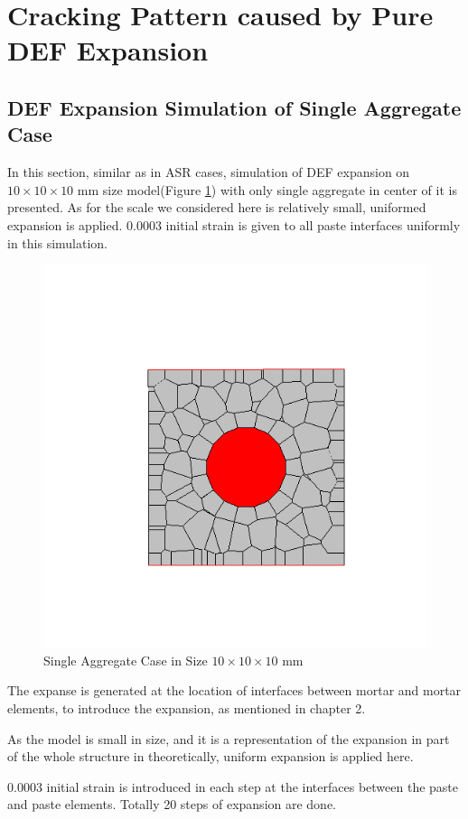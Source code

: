 \clearpage
\section{Cracking Pattern caused by Pure DEF Expansion}

\subsection{DEF Expansion Simulation of Single Aggregate Case}

In this section, similar as in ASR cases, simulation of DEF expansion on $10 \times 10 \times 10$ mm size model(Figure \ref{mmmm}) with only single aggregate in center of it is presented. As for the scale we considered here is relatively small, uniformed expansion is applied. 0.0003 initial strain is given to all paste interfaces uniformly in this simulation.

\begin{figure}[h!]
\centering

\includegraphics[width=0.4\linewidth]{Files/Small_ASR/CR/DEP5-STEP(001).png}
\caption{Single Aggregate Case in Size $10 \times 10 \times 10$ mm}
\label{mmmm}
\end{figure}


The expanse is generated at the location of interfaces between mortar and mortar elements, to introduce the expansion, as mentioned in chapter 2.

As the model is small in size, and it is a representation of the expansion in part of the whole structure in theoretically, uniform expansion is applied here.


0.0003 initial strain is introduced in each step at the interfaces between the paste and paste elements. Totally 20 steps of expansion are done.

